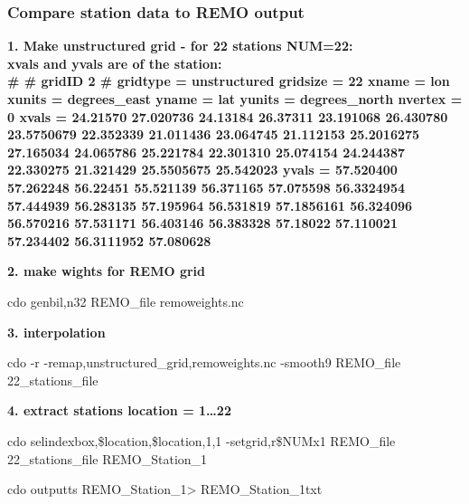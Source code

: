 \subsubsection{Compare station data to REMO output}

\bf{1.} Make unstructured grid  - for 22 stations NUM=22:\\
xvals and yvals are of the station:\\
\#
\# gridID 2
\#
gridtype  = unstructured
gridsize  = 22
xname     = lon
xunits    = degrees\_east
yname     = lat
yunits    = degrees\_north
nvertex   = 0
xvals     = 24.21570 27.020736 24.13184 26.37311 23.191068 26.430780 23.5750679 22.352339 21.011436  23.064745
            21.112153 25.2016275 27.165034 24.065786 25.221784 22.301310 25.074154 24.244387 22.330275 21.321429
            25.5505675 25.542023
yvals     = 57.520400 57.262248 56.22451 55.521139 56.371165 57.075598 56.3324954 57.444939 56.283135
	    57.195964 56.531819 57.1856161 56.324096 56.570216 57.531171 56.403146 56.383328 57.18022 
            57.110021 57.234402 56.3111952 57.080628


\bf{2.} make wights for REMO grid 

cdo genbil,n32 REMO\_file remoweights.nc

\bf{3.} interpolation

cdo -r -remap,unstructured\_grid,remoweights.nc -smooth9  REMO\_file  22\_stations\_file

\bf{4.} extract stations
location = 1…22

cdo selindexbox,\${location},\${location},1,1 -setgrid,r\${NUM}x1 REMO\_file  22\_stations\_file REMO\_Station\_1

cdo outputts REMO\_Station\_1> REMO_Station\_1txt




